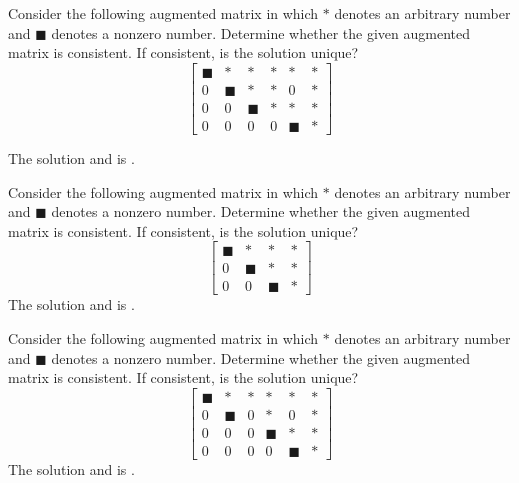 \documentclass{ximera}
\begin{document}
\begin{problem}\label{prb:2.4}
\label{Chapter1Q8}Consider the following augmented matrix in which $\ast $ denotes an
arbitrary number and $\blacksquare $ denotes a nonzero number. Determine
whether the given augmented matrix is consistent. If consistent, is the
solution unique?
\begin{equation*}
\left[
\begin{array}{ccccc|c}
\blacksquare & \ast & \ast & \ast & \ast & \ast \\
0 & \blacksquare & \ast & \ast & 0 & \ast \\
0 & 0 & \blacksquare & \ast & \ast & \ast \\
0 & 0 & 0 & 0 & \blacksquare & \ast
\end{array}
\right] 
\end{equation*}

The solution  and is .
\end{problem}

\begin{problem}\label{prb:2.5}
Consider the following augmented matrix in which $\ast $ denotes an arbitrary
number and $\blacksquare $ denotes a nonzero number. Determine whether the
given augmented matrix is consistent. If consistent, is the solution unique?
\begin{equation*}
\left[
\begin{array}{ccc|c}
\blacksquare & \ast & \ast & \ast \\
0 & \blacksquare & \ast & \ast \\
0 & 0 & \blacksquare & \ast
\end{array}
\right]
\end{equation*}
The solution  and is .
\end{problem}


\begin{problem}\label{prb:2.6}
Consider the following augmented matrix in which $\ast $ denotes an arbitrary
number and $\blacksquare $ denotes a nonzero number. Determine whether the
given augmented matrix is consistent. If consistent, is the solution unique?
\begin{equation*}
\left[
\begin{array}{ccccc|c}
\blacksquare & \ast & \ast & \ast & \ast & \ast \\
0 & \blacksquare & 0 & \ast & 0 & \ast \\
0 & 0 & 0 & \blacksquare & \ast & \ast \\
0 & 0 & 0 & 0 & \blacksquare & \ast
\end{array}
\right]
\end{equation*}
The solution  and is .
\end{problem}
\end{document}
